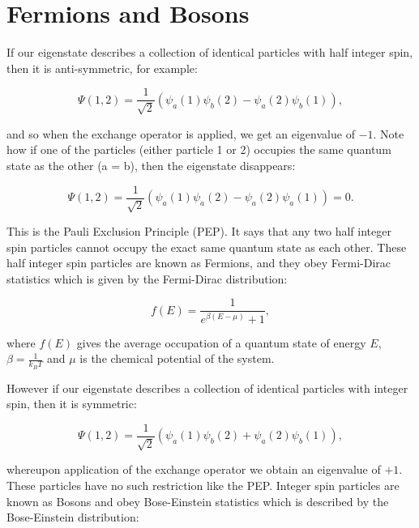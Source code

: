 \section{Fermions and Bosons}

If our eigenstate describes a collection of identical particles with half integer spin, then it is anti-symmetric, for example:

\begin{equation}
    \Psi (1, 2) = \frac{1}{\sqrt{2}} (\psi_a(1) \psi_b (2) - \psi_a (2) \psi_b (1)),
    \label{AntiSymmetricEigenfunction}
\end{equation}

\noindent and so when the exchange operator is applied, we get an eigenvalue of $-1$. Note how if one of the particles (either particle  1 or 2) occupies the same quantum state as the other (a = b), then the eigenstate disappears:

\begin{equation}
    \Psi (1, 2) = \frac{1}{\sqrt{2}} (\psi_a(1) \psi_a (2) - \psi_a (2) \psi_a (1)) = 0.
\end{equation}

\noindent This is the Pauli Exclusion Principle (PEP). It says that any two half integer spin particles cannot occupy the exact same quantum state as each other. These half integer spin particles are known as Fermions, and they obey Fermi-Dirac statistics which is given by the Fermi-Dirac distribution:

\begin{equation}
    f(E) = \frac{1}{e^{\beta (E - \mu)} + 1},
    \label{FermiDiracDistributionFunction}
\end{equation}

\noindent where $f(E)$ gives the average occupation of a quantum state of energy $E$, $\beta = \frac{1}{k_B T}$ and $\mu$ is the chemical potential of the system.

\noindent However if our eigenstate describes a collection of identical particles with integer spin, then it is symmetric:

\begin{equation}
    \Psi (1, 2) = \frac{1}{\sqrt{2}} (\psi_a(1) \psi_b (2) + \psi_a (2) \psi_b (1)),
    \label{SymmetricEigenfunction}
\end{equation}

\noindent whereupon application of the exchange operator we obtain an eigenvalue of $+1$. These particles have no such restriction like the PEP. Integer spin particles are known as Bosons and obey Bose-Einstein statistics which is described by the Bose-Einstein distribution:

